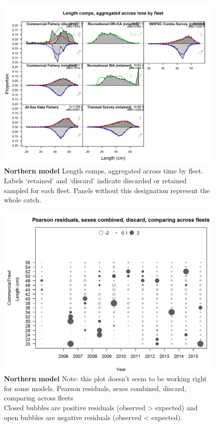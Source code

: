 \documentclass[12pt,]{article}
\begin{document}
\begin{figure}[htbp]
\centering
\includegraphics{./r4ss/plots_mod1/comp_lenfit__aggregated_across_time.png}
\caption{\textbf{Northern model} Length comps, aggregated across time by
fleet. Labels `retained' and `discard' indicate discarded or retained
sampled for each fleet. Panels without this designation represent the
whole catch. \label{fig:mod1_30_comp_lenfit__aggregated_across_time}}
\end{figure}

\begin{figure}[htbp]
\centering
\includegraphics{./r4ss/plots_mod1/comp_lenfit_sex1mkt1_multi-fleet_comparison.png}
\caption{\textbf{Northern model} Note: this plot doesn't seem to be
working right for some models. Pearson residuals, sexes combined,
discard, comparing across fleets\\
Closed bubbles are positive residuals (observed \textgreater{} expected)
and open bubbles are negative residuals (observed \textless{} expected).
\label{fig:mod1_31_comp_lenfit_sex1mkt1_multi-fleet_comparison}}
\end{figure}
\end{document}
